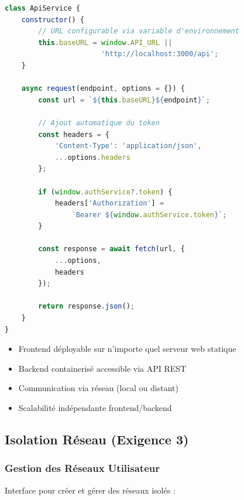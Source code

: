 \documentclass[12pt,a4paper]{article}
\begin{document}
\begin{lstlisting}[language=JavaScript,caption=Configuration API (api-service.js)]
class ApiService {
    constructor() {
        // URL configurable via variable d'environnement
        this.baseURL = window.API_URL || 
                       'http://localhost:3000/api';
    }
    
    async request(endpoint, options = {}) {
        const url = `${this.baseURL}${endpoint}`;
        
        // Ajout automatique du token
        const headers = {
            'Content-Type': 'application/json',
            ...options.headers
        };
        
        if (window.authService?.token) {
            headers['Authorization'] = 
                `Bearer ${window.authService.token}`;
        }
        
        const response = await fetch(url, {
            ...options,
            headers
        });
        
        return response.json();
    }
}
\end{lstlisting}

\begin{infobox}
\begin{itemize}
    \item Frontend déployable sur n'importe quel serveur web statique
    \item Backend containerisé accessible via API REST
    \item Communication via réseau (local ou distant)
    \item Scalabilité indépendante frontend/backend
\end{itemize}
\end{infobox}

\subsection{Isolation Réseau (Exigence 3)}

\subsubsection{Gestion des Réseaux Utilisateur}

Interface pour créer et gérer des réseaux isolés :
\end{document}
